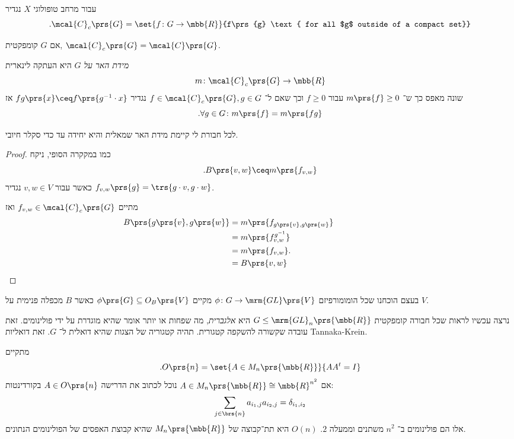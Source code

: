 \documentclass[10pt, twoside]{book}
\newcommand{\textenglish}[1]{\foreignlanguage{english}{#1}}
\begin{document}
\begin{definition}
עבור מרחב טופולוגי
$X$
נגדיר
\[\text{.}\mcal{C}_c\prs{G} = \set{f \colon G \to \mbb{R}}{f\prs{g} \text{ for all $g$ outside of a compact set}}\]
\end{definition}

\begin{remark}
אם
$G$
קומפקטית,
$\mcal{C}_c\prs{G} = \mcal{C}\prs{G}$.
\end{remark}

\begin{definition}
\emph{מידת האר על $G$}
היא העתקה לינארית
\[m \colon \mcal{C}_c\prs{G} \to \mbb{R}\]
שונה מאפס כך ש־%
$m\prs{f} \geq 0$
עבור
$f \geq 0$
וכך שאם ל־%
$f \in \mcal{C}_c\prs{G}, g \in G$
נגדיר
$fg\prs{x} \ceq f\prs{g^{-1} \cdot x}$
אז
\[\text{.} \forall g \in G \colon m\prs{f} = m\prs{fg}\]
\end{definition}

\begin{theorem}[האר]
לכל חבורת לי קיימת מידת האר שמאלית והיא יחידה עד כדי סקלר חיובי.
\end{theorem}

\begin{proof} %
כמו במקקרה הסופי, ניקח
\[\text{.} B\prs{v,w} \ceq m\prs{f_{v,w}}\]
כאשר עבור
$v,w \in V$
נגדיר
$f_{v,w}\prs{g} = \trs{g \cdot v, g \cdot w}$.

מתיים
$f_{v,w} \in \mcal{C}_c\prs{G}$
ואז
\begin{align*}
B\prs{g\prs{v}, g\prs{w}} &= m\prs{f_{g\prs{v}, g\prs{w}}}
\\&= m\prs{f^{g^{-1}}_{v,w}}
\\&= m\prs{f_{v,w}}
\text{.} \hphantom{B\prs{g\prs{v}, g\prs{w}}} \\&= B\prs{v,w}
\end{align*}
\end{proof}

\begin{remark}
בעצם הוכחנו שכל הומומורפיזם
$\phi \colon G \to \mrm{GL}\prs{V}$
מקיים
$\phi\prs{G} \subseteq O_B\prs{V}$
כאשר
$B$
מכפלה פנימית על
$V$.
\end{remark}

נרצה עכשיו לראות שכל חבורה קומפקטית
$G \leq \mrm{GL}_n\prs{\mbb{R}}$
היא
\emph{אלגברית},
מה שפחות או יותר אומר שהיא מוגדרת על ידי פולינומים.
זאת עובדה שקשורה להשקפה קטגורית. תהיה קטגוריה של הצגות שהיא דואלית ל־%
$G$.
זאת דואליות
\textenglish{Tannaka-Krein}.

\begin{example}
מתקיים
\[\text{.} O\prs{n} = \set{A \in M_n\prs{\mbb{R}}}{A A^t = I}\]
אם
$A \in M_n\prs{\mbb{R}} \cong \mbb{R}^{n^2}$
נוכל לכתוב את הדרישה
$A \in O\prs{n}$
בקורדינטות:
\[\sum_{j \in \brs{n}} a_{i_1,j} a_{i_2,j} = \delta_{i_1, i_2}\]
אלו הם פולינומים ב־%
$n^2$
משתנים וממעלה
$2$.
$O(n)$
היא תת־קבוצה של
$M_n\prs{\mbb{R}}$
שהיא קבוצת האפסים של הפולינומים הנתונים.
\end{example}
\end{document}
